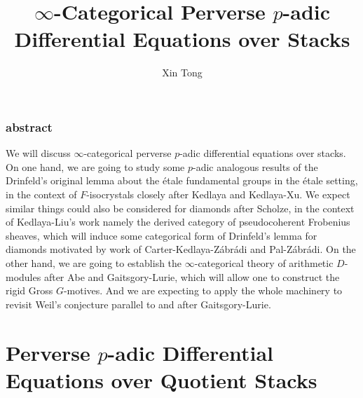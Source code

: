 \documentclass[11pt]{book}
\theoremstyle{definition}
\numberwithin{equation}{section}
\begin{document}
\normalfont



\title{$\infty$-Categorical Perverse $p$-adic Differential Equations over Stacks}
\author{Xin Tong}
\date{}





\maketitle


\newpage


\subsection*{abstract}
\rm We will discuss $\infty$-categorical perverse $p$-adic differential equations over stacks. On one hand, we are going to study some $p$-adic analogous results of the Drinfeld's original lemma about the \'etale fundamental groups in the \'etale setting, in the context of $F$-isocrystals closely after Kedlaya and Kedlaya-Xu. We expect similar things could also be considered for diamonds after Scholze, in the context of Kedlaya-Liu's work namely the derived category of pseudocoherent Frobenius sheaves, which will induce some categorical form of Drinfeld's lemma for diamonds motivated by work of Carter-Kedlaya-Z\'abr\'adi and Pal-Z\'abr\'adi. On the other hand, we are going to establish the $\infty$-categorical theory of arithmetic $D$-modules after Abe and Gaitsgory-Lurie, which will allow one to construct the rigid Gross $G$-motives. And we are expecting to apply the whole machinery to revisit Weil's conjecture parallel to and after Gaitsgory-Lurie.



\newpage





\newpage

\tableofcontents




\newpage

\chapter{Perverse $p$-adic Differential Equations over Quotient Stacks}
\end{document}
